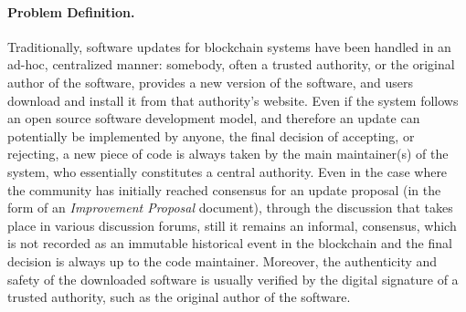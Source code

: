 

\paragraph{Problem Definition.}
Traditionally, software updates for blockchain systems have been handled in an ad-hoc, centralized manner: somebody, often a trusted authority, or the original author of the software, provides a new version of the software, and users
download and install it from that authority's website. Even if the system follows an open source software development model, and therefore an update can potentially be implemented by anyone, the final decision of accepting, or rejecting, a new piece of code is always taken by the main maintainer(s) of the system, who essentially constitutes a central authority. Even in the case where the community has initially reached consensus for an update proposal (in the form of an \emph{Improvement Proposal} document), through the discussion that takes place in various discussion forums, still it remains an informal,  consensus, which is not recorded as an immutable historical event in the blockchain and the final decision is always up to the code maintainer. Moreover, the authenticity and safety of the downloaded software is usually verified by the digital signature of a trusted authority, such as the original author of the software.

